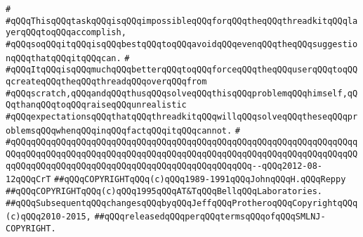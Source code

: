 \verb|#|\newline
\verb|#qQQqThisqQQqtaskqQQqisqQQqimpossibleqQQqforqQQqtheqQQqthreadkitqQQqlayerqQQqtoqQQqaccomplish,|\newline
\verb|#qQQqsoqQQqitqQQqisqQQqbestqQQqtoqQQqavoidqQQqevenqQQqtheqQQqsuggestionqQQqthatqQQqitqQQqcan.|\newline
\verb|#|\newline
\verb|#qQQqItqQQqisqQQqmuchqQQqbetterqQQqtoqQQqforceqQQqtheqQQquserqQQqtoqQQqcreateqQQqtheqQQqthreadqQQqoverqQQqfrom|\newline
\verb|#qQQqscratch,qQQqandqQQqthusqQQqsolveqQQqthisqQQqproblemqQQqhimself,qQQqthanqQQqtoqQQqraiseqQQqunrealistic|\newline
\verb|#qQQqexpectationsqQQqthatqQQqthreadkitqQQqwillqQQqsolveqQQqtheseqQQqproblemsqQQqwhenqQQqinqQQqfactqQQqitqQQqcannot.|\newline
\verb|#|\newline
\verb|#qQQqqQQqqQQqqQQqqQQqqQQqqQQqqQQqqQQqqQQqqQQqqQQqqQQqqQQqqQQqqQQqqQQqqQQqqQQqqQQqqQQqqQQqqQQqqQQqqQQqqQQqqQQqqQQqqQQqqQQqqQQqqQQqqQQqqQQqqQQqqQQqqQQqqQQqqQQqqQQqqQQqqQQqqQQqqQQqqQQqqQQqqQQq--qQQq2012-08-12qQQqCrT|\newline
\newline
\verb|##qQQqCOPYRIGHTqQQq(c)qQQq1989-1991qQQqJohnqQQqH.qQQqReppy|\newline
\verb|##qQQqCOPYRIGHTqQQq(c)qQQq1995qQQqAT&TqQQqBellqQQqLaboratories.|\newline
\verb|##qQQqSubsequentqQQqchangesqQQqbyqQQqJeffqQQqProtheroqQQqCopyrightqQQq(c)qQQq2010-2015,|\newline
\verb|##qQQqreleasedqQQqperqQQqtermsqQQqofqQQqSMLNJ-COPYRIGHT.|\newline

